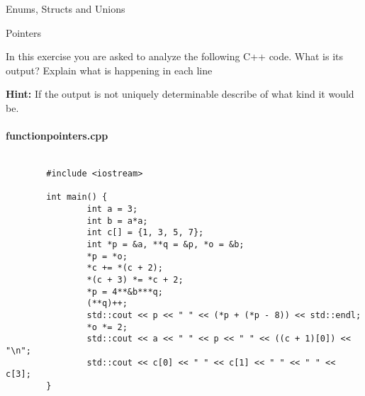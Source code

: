 \documentclass[12pt,a4paper]{scrartcl}
\begin{document}
\begin{aufgabe}[8]{Enums, Structs and Unions}
\end{aufgabe}

\newpage

\begin{aufgabe}[5]{Pointers}

In this exercise you are asked to analyze the following C++ code. What is its output?
Explain what is happening in each line

\textbf{Hint: } If the output is not uniquely determinable describe of what kind it would be.

	\paragraph*{functionpointers.cpp}\phantom{.}
	\begin{lstlisting}[gobble=8]
		
		#include <iostream>

        int main() {
                int a = 3;
                int b = a*a;
                int c[] = {1, 3, 5, 7};
                int *p = &a, **q = &p, *o = &b;
                *p = *o;
                *c += *(c + 2);
                *(c + 3) *= *c + 2;
                *p = 4**&b***q;
                (**q)++;
                std::cout << p << " " << (*p + (*p - 8)) << std::endl;
                *o *= 2;
                std::cout << a << " " << p << " " << ((c + 1)[0]) << "\n";
                std::cout << c[0] << " " << c[1] << " " << " " << c[3];
        }
	
	\end{lstlisting}
	
\end{aufgabe}

\newpage
\end{document}
